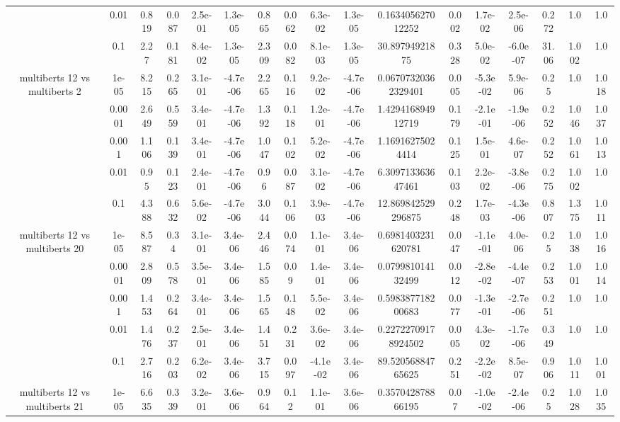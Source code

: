 \begin{tabular}{|c|c|c|c|c|c|c|c|c|c|c|c|c|c|c|c|c|}
 & 0.01 & 0.819 & 0.087 & 2.5e-01 & 1.3e-05 & 0.865 & 0.062 & 6.3e-02 & 1.3e-05 & 0.163405627012252 & 0.002 & 1.7e-02 & 2.5e-06 & 0.272 & 1.0 & 1.0 \\
 & 0.1 & 2.27 & 0.181 & 8.4e-02 & 1.3e-05 & 2.309 & 0.082 & 8.1e-03 & 1.3e-05 & 30.89794921875 & 0.328 & 5.0e-02 & -6.0e-07 & 31.06 & 1.002 & 1.0 \\
\hline
\multirow{5}{*}{multiberts 12 vs multiberts 2} & 1e-05 & 8.215 & 0.265 & 3.1e-01 & -4.7e-06 & 2.265 & 0.116 & 9.2e-02 & -4.7e-06 & 0.06707320362329401 & 0.005 & -5.3e-02 & 5.9e-06 & 0.25 & 1.0 & 1.018 \\
 & 0.0001 & 2.649 & 0.559 & 3.4e-01 & -4.7e-06 & 1.392 & 0.118 & 1.2e-01 & -4.7e-06 & 1.429416894912719 & 0.179 & -2.1e-01 & -1.9e-06 & 0.252 & 1.046 & 1.037 \\
 & 0.001 & 1.106 & 0.139 & 3.4e-01 & -4.7e-06 & 1.047 & 0.102 & 5.2e-02 & -4.7e-06 & 1.16916275024414 & 0.125 & 1.5e-01 & 4.6e-07 & 0.252 & 1.061 & 1.013 \\
 & 0.01 & 0.95 & 0.123 & 2.4e-01 & -4.7e-06 & 0.96 & 0.087 & 3.1e-02 & -4.7e-06 & 6.309713363647461 & 0.103 & 2.2e-02 & -3.8e-06 & 0.275 & 1.002 & 1.0 \\
 & 0.1 & 4.388 & 0.632 & 5.6e-02 & -4.7e-06 & 3.044 & 0.106 & 3.9e-03 & -4.7e-06 & 12.869842529296875 & 0.248 & 1.7e-03 & -4.3e-06 & 0.807 & 1.375 & 1.011 \\
\hline
\multirow{5}{*}{multiberts 12 vs multiberts 20} & 1e-05 & 8.587 & 0.34 & 3.1e-01 & 3.4e-06 & 2.446 & 0.074 & 1.1e-01 & 3.4e-06 & 0.6981403231620781 & 0.047 & -1.1e-01 & 4.0e-06 & 0.25 & 1.038 & 1.016 \\
 & 0.0001 & 2.809 & 0.578 & 3.5e-01 & 3.4e-06 & 1.585 & 0.09 & 1.4e-01 & 3.4e-06 & 0.079981014132499 & 0.012 & -2.8e-02 & -4.4e-07 & 0.253 & 1.001 & 1.014 \\
 & 0.001 & 1.453 & 0.264 & 3.4e-01 & 3.4e-06 & 1.565 & 0.148 & 5.5e-02 & 3.4e-06 & 0.598387718200683 & 0.077 & -1.3e-01 & -2.7e-06 & 0.251 & 1.0 & 1.0 \\
 & 0.01 & 1.476 & 0.237 & 2.5e-01 & 3.4e-06 & 1.451 & 0.231 & 3.6e-02 & 3.4e-06 & 0.22722709178924502 & 0.005 & 4.3e-02 & -1.7e-06 & 0.349 & 1.0 & 1.0 \\
 & 0.1 & 2.716 & 0.203 & 6.2e-02 & 3.4e-06 & 3.715 & 0.097 & -4.1e-02 & 3.4e-06 & 89.52056884765625 & 0.251 & -2.2e-02 & 8.5e-07 & 0.906 & 1.011 & 1.001 \\
\hline
\multirow{5}{*}{multiberts 12 vs multiberts 21} & 1e-05 & 6.635 & 0.339 & 3.2e-01 & 3.6e-06 & 0.964 & 0.12 & 1.1e-01 & 3.6e-06 & 0.357042878866195 & 0.07 & -1.0e-02 & -2.4e-06 & 0.25 & 1.028 & 1.035 \\

\end{tabular}
